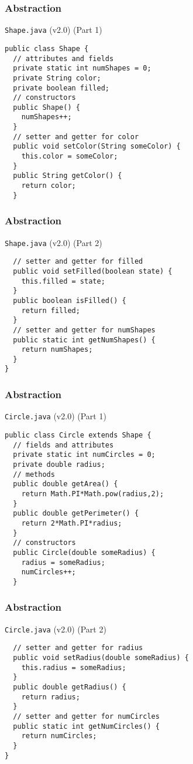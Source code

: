 \documentclass[10pt, compress]{beamer}
\begin{document}
\begin{frame}[fragile]
  \frametitle{Abstraction}
  \begin{block}{\texttt{Shape.java} (v2.0) (Part 1)}
    \begin{verbatim}
public class Shape {
  // attributes and fields
  private static int numShapes = 0;
  private String color;
  private boolean filled;
  // constructors
  public Shape() {
    numShapes++;
  }
  // setter and getter for color
  public void setColor(String someColor) {
    this.color = someColor;
  }
  public String getColor() {
    return color;
  }
    \end{verbatim}
  \end{block}
\end{frame}

\begin{frame}[fragile]
  \frametitle{Abstraction}
  \begin{block}{\texttt{Shape.java} (v2.0) (Part 2)}
    \begin{verbatim}
  // setter and getter for filled
  public void setFilled(boolean state) {
    this.filled = state;
  }
  public boolean isFilled() {
    return filled;
  }
  // setter and getter for numShapes
  public static int getNumShapes() {
    return numShapes;
  }
}
    \end{verbatim}
  \end{block}
\end{frame}

\begin{frame}[fragile]
  \frametitle{Abstraction}
  \begin{block}{\texttt{Circle.java} (v2.0) (Part 1)}
    \begin{verbatim}
public class Circle extends Shape {
  // fields and attributes
  private static int numCircles = 0;
  private double radius;
  // methods
  public double getArea() {
    return Math.PI*Math.pow(radius,2);
  }
  public double getPerimeter() {
    return 2*Math.PI*radius;
  }
  // constructors
  public Circle(double someRadius) {
    radius = someRadius;
    numCircles++;
  }
    \end{verbatim}
  \end{block}
\end{frame}

\begin{frame}[fragile]
  \frametitle{Abstraction}
  \begin{block}{\texttt{Circle.java} (v2.0) (Part 2)}
    \begin{verbatim}
  // setter and getter for radius
  public void setRadius(double someRadius) {
    this.radius = someRadius;
  }
  public double getRadius() {
    return radius;
  }
  // setter and getter for numCircles
  public static int getNumCircles() {
    return numCircles;
  }
}
    \end{verbatim}
  \end{block}
\end{frame}
\end{document}
